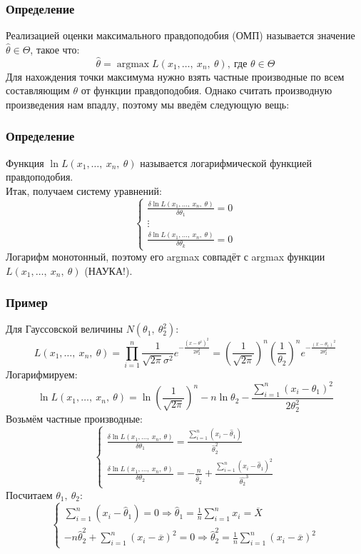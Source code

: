 \documentclass[12pt, a4paper]{article}
\newcommand{\sion}{\sum\limits_{i = 1}^{n}}
\begin{document}
\subsubsection*{Определение}
Реализацией оценки максимального правдоподобия (ОМП) называется значение $\hat{\theta} \in \Theta$, такое что:
\[\hat{\theta} = \operatorname{argmax} L(x_1,\dots,\ x_n,\ \theta),\ \text{где }\theta \in \Theta\]
Для нахождения точки максимума нужно взять частные производные по всем составляющим $\theta$ от функции правдоподобия. Однако считать производную произведения нам впадлу, поэтому мы введём следующую вещь:
\subsubsection*{Определение}
Функция $\ln L(x_1,\dots,\ x_n,\ \theta)$ называется логарифмической функцией правдоподобия.\\
Итак, получаем систему уравнений:
\[\begin{cases}
    \frac{\delta \ln L(x_1,\dots,\ x_n,\ \theta)}{\delta \theta_1} = 0\\
    \vdots\\
    \frac{\delta \ln L(x_1,\dots,\ x_n,\ \theta)}{\delta \theta_k} = 0
\end{cases}\]
Логарифм монотонный, поэтому его argmax совпадёт с argmax функции $L(x_1,\dots,\ x_n,\ \theta)$ (НАУКА!).
\subsubsection*{Пример}
Для Гауссовской величины $N(\theta_1,\ \theta_2^2)$:
\[L(x_1,\dots,\ x_n,\ \theta) = \prod\limits_{i = 1}^{n} \frac{1}{\sqrt{2\pi}\sigma^2} e^{-\frac{(x - \theta^1)^2}{2\theta_2^2}} = \left( \frac{1}{\sqrt{2\pi}} \right)^n \left( \frac{1}{\theta_2} \right)^n e^{-\frac{(x - \theta_1)^2}{2\theta_2^2}}\]
Логарифмируем:
\[\ln L(x_1,\dots,\ x_n,\ \theta) = \ln \left( \frac{1}{\sqrt{2\pi}} \right)^n - n\ln \theta_2 - \frac{\sion (x_i - \theta_1)^2}{2\theta_2^2}\]
Возьмём частные производные:
\[\begin{cases}
    \frac{\delta \ln L(x_1,\dots,\ x_n,\ \theta)}{ \delta \theta_1} = \frac{\sion (x_i - \hat{\theta}_1)}{\hat{\theta}_2^2}\\
    \frac{\delta \ln L(x_1,\dots,\ x_n,\ \theta)}{\delta \theta_2} = -\frac{n}{\hat{\theta}_2} + \frac{\sion (x_i - \hat{\theta}_1)^2}{\hat{\theta_2}^3}
\end{cases}\]
Посчитаем $\theta_1,\ \theta_2$:
\[\begin{cases}
    \sion (x_i - \hat{\theta}_1) = 0 \Rightarrow \hat{\theta}_1 = \frac{1}{n} \sion x_i = \overline{X}\\
    -n\hat{\theta}_2^2 + \sion (x_i - \overline{x})^2 = 0 \Rightarrow \hat{\theta}_2^2 = \frac{1}{n} \sion (x_i - \overline{x})^2
\end{cases}\]
\end{document}
